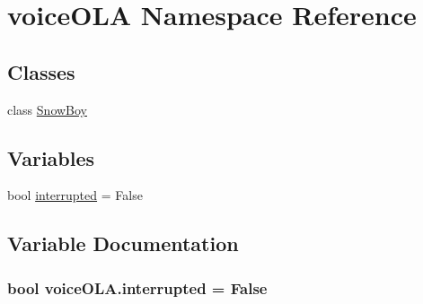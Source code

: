\hypertarget{namespacevoiceOLA}{}\section{voice\+O\+LA Namespace Reference}
\label{namespacevoiceOLA}
\subsection*{Classes}
\begin{DoxyCompactItemize}
\item 
class \hyperlink{classvoiceOLA_1_1SnowBoy}{Snow\+Boy}
\end{DoxyCompactItemize}
\subsection*{Variables}
\begin{DoxyCompactItemize}
\item 
bool \hyperlink{namespacevoiceOLA_a3a6b55040aa1eb602e4efbf0b4f30a09}{interrupted} = False
\end{DoxyCompactItemize}


\subsection{Variable Documentation}
\subsubsection[{\texorpdfstring{interrupted}{interrupted}}]{\setlength{\rightskip}{0pt plus 5cm}bool voice\+O\+L\+A.\+interrupted = False}\hypertarget{namespacevoiceOLA_a3a6b55040aa1eb602e4efbf0b4f30a09}{}\label{namespacevoiceOLA_a3a6b55040aa1eb602e4efbf0b4f30a09}
